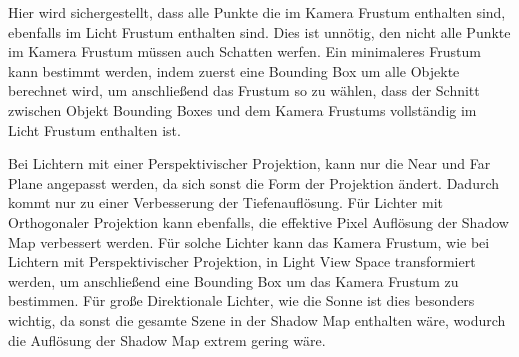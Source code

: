 Hier wird sichergestellt, dass alle Punkte die im Kamera Frustum enthalten sind, ebenfalls im
Licht Frustum enthalten sind. Dies ist unnötig, den nicht alle Punkte im Kamera Frustum müssen auch Schatten werfen.
Ein minimaleres Frustum kann bestimmt werden, indem zuerst eine Bounding Box um alle Objekte berechnet wird,
um anschließend das Frustum so zu wählen, 
dass der Schnitt zwischen Objekt Bounding Boxes und dem Kamera Frustums vollständig im
Licht Frustum enthalten ist.
\par
Bei Lichtern mit einer Perspektivischer Projektion, kann nur die Near und Far Plane angepasst werden, da sich sonst die Form der Projektion
ändert. 
Dadurch kommt nur zu einer Verbesserung der Tiefenauflösung.
Für Lichter mit Orthogonaler Projektion kann ebenfalls, die effektive Pixel Auflösung der Shadow Map verbessert werden.
Für solche Lichter kann das Kamera Frustum, wie bei Lichtern mit Perspektivischer Projektion, in Light View Space 
transformiert werden, um anschließend eine Bounding Box um das Kamera Frustum zu bestimmen. 
Für große Direktionale Lichter, wie die Sonne ist dies besonders wichtig, da sonst die gesamte Szene in der Shadow Map enthalten wäre,
wodurch die Auflösung der Shadow Map extrem gering wäre.

